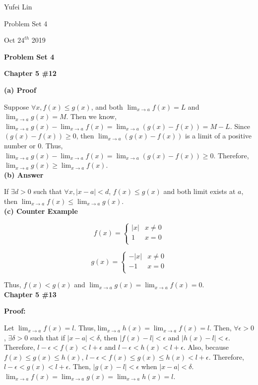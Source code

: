 \documentclass[a4paper,12pt]{report}
\begin{document}
\noindent
Yufei Lin

\noindent
Problem Set 4

\noindent
Oct \(24^{th}\) 2019

\begin{center}
\textbf{Problem Set 4}
\end{center}

\noindent
\textbf{Chapter 5 \#12}

\noindent
\textbf{(a) Proof }

\noindent
Suppose $\forall x, f(x)\leq g(x)$, and both $\displaystyle{\lim_{x\to a}}f(x) = L$ and $\displaystyle{\lim_{x\to a}}g(x) = M$. Then we know, $\displaystyle{\lim_{x\to a}}g(x)-\displaystyle{\lim_{x\to a}}f(x)=\displaystyle{\lim_{x\to a}}(g(x)-f(x)) = M-L$. Since $(g(x)-f(x))\geq 0$, then $\displaystyle{\lim_{x\to a}}(g(x)-f(x))$ is a limit of a positive number or 0. Thus,  $\displaystyle{\lim_{x\to a}}g(x)-\displaystyle{\lim_{x\to a}}f(x)=\displaystyle{\lim_{x\to a}}(g(x)-f(x))\geq 0$. Therefore, $\displaystyle{\lim_{x\to a}}g(x)\geq \displaystyle{\lim_{x\to a}}f(x)$.\\

\noindent
\textbf{(b) Answer }

\noindent
If $\exists d >0$ such that $\forall x, |x-a|<d$, $f(x)\leq g(x)$ and both limit exists at $a$, then $\displaystyle{\lim_{x\to a}}f(x)\leq \displaystyle{\lim_{x\to a}}g(x)$.\\

\noindent
\textbf{(c) Counter Example}

\[  f(x)= \left\{
\begin{array}{ll}
      |x| & x\neq 0 \\
      1 & x = 0 \\
\end{array} 
\right. \]

\[  g(x)= \left\{
\begin{array}{ll}
      -|x| & x\neq 0 \\
      -1 & x = 0 \\
\end{array} 
\right. \]

\noindent
Thus, $f(x)<g(x)$ and $\displaystyle{\lim_{x\to a}}g(x) = \displaystyle{\lim_{x\to a}}f(x) = 0$.\\

\noindent
\textbf{Chapter 5 \#13}

\noindent
\textbf{Proof: }

\noindent
Let $\displaystyle{\lim_{x\to a}}f(x) =l$. Thus,$\displaystyle{\lim_{x\to a}}h(x) =\displaystyle{\lim_{x\to a}}f(x)=l$. Then, $\forall \epsilon >0$, $\exists \delta >0$ such that if $|x-a|<\delta$, then $|f(x)-l|<\epsilon$ and $|h(x)-l|<\epsilon$. Therefore, $l-\epsilon <f(x)<l+\epsilon$ and $l-\epsilon <h(x)<l+\epsilon$. Also, because $f(x)\leq g(x)\leq h(x)$, $l-\epsilon <f(x)\leq g(x)\leq h(x)<l+\epsilon$. Therefore, $l-\epsilon <g(x)<l+\epsilon$. Then, $|g(x)-l|<\epsilon$ when $|x-a|<\delta$.  $\displaystyle{\lim_{x\to a}}f(x) =\displaystyle{\lim_{x\to a}}g(x) =\displaystyle{\lim_{x\to a}}h(x) =l$.	\\
\end{document}
